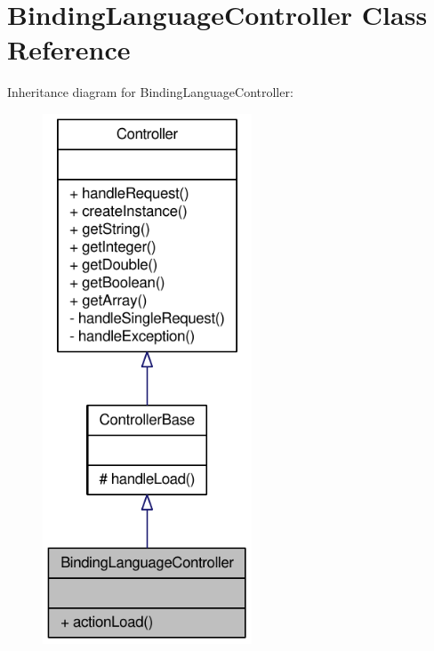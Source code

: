 \hypertarget{classBindingLanguageController}{
\section{BindingLanguageController Class Reference}
\label{classBindingLanguageController}
}


Inheritance diagram for BindingLanguageController:\nopagebreak
\begin{figure}[H]
\begin{center}
\leavevmode
\includegraphics[width=176pt]{classBindingLanguageController__inherit__graph}
\end{center}
\end{figure}


